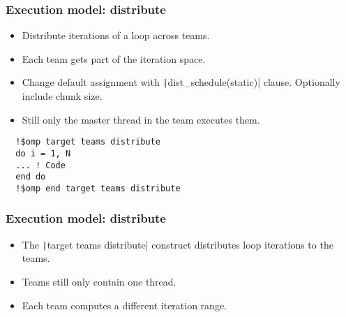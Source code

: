 \documentclass[aspectratio=169]{beamer}
\begin{document}
  \begin{frame}[fragile]
  \frametitle{Execution model: distribute}
  \begin{itemize}
    \item Distribute iterations of a loop across teams.
    \item Each team gets part of the iteration space.
    \item Change default assignment with \texttt|dist_schedule(static)| clause. Optionally include chunk size.
    \item Still only the master thread in the team executes them.
  \end{itemize}
  
  \begin{verbatim}
  !$omp target teams distribute
  do i = 1, N
  ... ! Code
  end do
  !$omp end target teams distribute
  \end{verbatim}
  \end{frame}
  
  \begin{frame}
  \frametitle{Execution model: distribute}
  \begin{itemize}
    \item The \texttt|target teams distribute| construct distributes loop iterations to the teams.
    \item Teams still only contain one thread.
    \item Each team computes a different iteration range.
  \end{itemize}
  
  \begin{center}
  \end{center}
  \end{frame}
  
\end{document}
